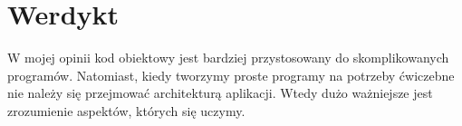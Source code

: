 \newpage

\section{Werdykt}

\begin{mdframed}[backgroundcolor=yellow!20]
    W mojej opinii kod obiektowy jest bardziej przystosowany do skomplikowanych programów. Natomiast, kiedy tworzymy proste programy na potrzeby ćwiczebne nie należy się przejmować architekturą aplikacji. Wtedy dużo ważniejsze jest zrozumienie aspektów, których się uczymy.
\end{mdframed}

